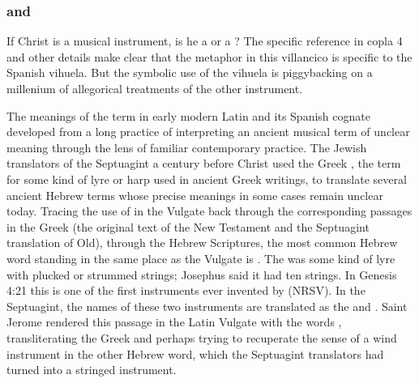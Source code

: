 
\subsubsection{ and }

If Christ is a musical instrument, is he a  or a ?  
The specific reference in copla 4 and other details make clear that the
metaphor in this villancico is specific to the Spanish 
vihuela.
But the symbolic use of the vihuela is piggybacking on a millenium of
allegorical treatments of the other instrument.

The meanings of the term  in early modern Latin and its Spanish
cognate  developed from a long practice of interpreting an
ancient musical term of unclear meaning through the lens of familiar
contemporary practice.
The Jewish translators of the Septuagint a century before Christ used the
Greek , the term for some kind of lyre or harp used in ancient
Greek writings, to translate several ancient Hebrew terms whose precise
meanings in some cases remain unclear today.%
    \Autocite{Lawergren:Lyres}
Tracing the use of  in the Vulgate back through the corresponding
passages in the Greek (the original text of the New Testament and the
Septuagint translation of Old), through the Hebrew Scriptures, the most common
Hebrew word standing in the same place as the Vulgate  is
.
The  was some kind of lyre with plucked or strummed strings;
Josephus said it had ten strings.%
    \Autocite[]{Bromily:BibleEncyclopedia}
In Genesis 4:21 this is one of the first instruments ever invented by
 (NRSV).
In the Septuagint, the names of these two instruments are translated as the
 and .
Saint Jerome rendered this passage in the Latin Vulgate with the words
, transliterating the Greek  and
perhaps trying to recuperate the sense of a wind instrument in the other Hebrew
word, which the Septuagint translators had turned into a stringed instrument.


